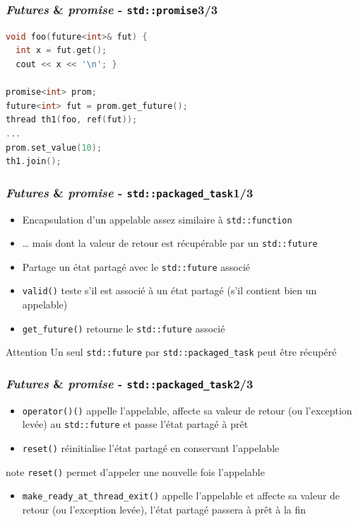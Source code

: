 \documentclass[C++.tex]{subfiles}
\begin{document}
\begin{frame}[fragile]
	\frametitle{\textit{Futures} \& \textit{promise} - \lstinline|std::promise|\titlehfill{}3/3}
	\begin{lstlisting}[language=C++]
void foo(future<int>& fut) {
  int x = fut.get();
  cout << x << '\n'; }

promise<int> prom;
future<int> fut = prom.get_future();
thread th1(foo, ref(fut));
...
prom.set_value(10);
th1.join();\end{lstlisting}
\end{frame}

\begin{frame}[fragile]
	\frametitle{\textit{Futures} \& \textit{promise} - \lstinline|std::packaged_task|\titlehfill{}1/3}
	\begin{itemize}
		\item Encapsulation d'un appelable assez similaire à \lstinline|std::function|
		\item \ldots{} mais dont la valeur de retour est récupérable par un \lstinline|std::future|
		\item Partage un état partagé avec le \lstinline|std::future| associé
		\item \lstinline|valid()| teste s'il est associé à un état partagé (s'il contient bien un appelable)
		\item \lstinline|get_future()| retourne le \lstinline|std::future| associé
	\end{itemize}

	\begin{alertblock}{Attention}
		Un seul \lstinline|std::future| par \lstinline|std::packaged_task| peut être récupéré
	\end{alertblock}
\end{frame}

\begin{frame}[fragile]
	\frametitle{\textit{Futures} \& \textit{promise} - \lstinline|std::packaged_task|\titlehfill{}2/3}
	\begin{itemize}
		\item \lstinline|operator()()| appelle l'appelable, affecte sa valeur de retour (ou l'exception levée) au \lstinline|std::future| et passe l'état partagé à prêt
		\item \lstinline|reset()| réinitialise l'état partagé en conservant l'appelable
	\end{itemize}

	\begin{block}{note}
		\lstinline|reset()| permet d'appeler une nouvelle fois l'appelable
	\end{block}

	\begin{itemize}
		\item \lstinline|make_ready_at_thread_exit()| appelle l'appelable et affecte sa valeur de retour (ou l'exception levée), l'état partagé passera à prêt à la fin
	\end{itemize}
\end{frame}
\end{document}
